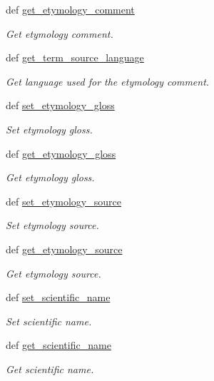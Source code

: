 \begin{DoxyCompactItemize}
def \hyperlink{classlmf_1_1src_1_1core_1_1definition_1_1_definition_aded2ab7ad4cf7d437a795d2d861278b4}{get\+\_\+etymology\+\_\+comment}
\begin{DoxyCompactList}\small\item\em Get etymology comment. \end{DoxyCompactList}\item 
def \hyperlink{classlmf_1_1src_1_1core_1_1definition_1_1_definition_a6e50bf6e6745b8bd9b473144f28c51b6}{get\+\_\+term\+\_\+source\+\_\+language}
\begin{DoxyCompactList}\small\item\em Get language used for the etymology comment. \end{DoxyCompactList}\item 
def \hyperlink{classlmf_1_1src_1_1core_1_1definition_1_1_definition_acc298f1512cabc232b93600e169d2f89}{set\+\_\+etymology\+\_\+gloss}
\begin{DoxyCompactList}\small\item\em Set etymology gloss. \end{DoxyCompactList}\item 
def \hyperlink{classlmf_1_1src_1_1core_1_1definition_1_1_definition_ac254957109847f1b5551ce2cc30d3998}{get\+\_\+etymology\+\_\+gloss}
\begin{DoxyCompactList}\small\item\em Get etymology gloss. \end{DoxyCompactList}\item 
def \hyperlink{classlmf_1_1src_1_1core_1_1definition_1_1_definition_a3105eceee6a4975183d655df3a731bb6}{set\+\_\+etymology\+\_\+source}
\begin{DoxyCompactList}\small\item\em Set etymology source. \end{DoxyCompactList}\item 
def \hyperlink{classlmf_1_1src_1_1core_1_1definition_1_1_definition_a112fe099d33e869c0b97de8956200d05}{get\+\_\+etymology\+\_\+source}
\begin{DoxyCompactList}\small\item\em Get etymology source. \end{DoxyCompactList}\item 
def \hyperlink{classlmf_1_1src_1_1core_1_1definition_1_1_definition_ae874984b7b123cdcedbf3cd05cbdffa9}{set\+\_\+scientific\+\_\+name}
\begin{DoxyCompactList}\small\item\em Set scientific name. \end{DoxyCompactList}\item 
def \hyperlink{classlmf_1_1src_1_1core_1_1definition_1_1_definition_a6bae0382f864136e0538bab372bbcc6d}{get\+\_\+scientific\+\_\+name}
\begin{DoxyCompactList}\small\item\em Get scientific name. \end{DoxyCompactList}\end{DoxyCompactItemize}

